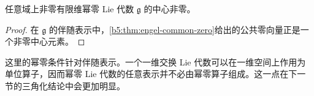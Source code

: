 \begin{corollary}\label{b5:cor:nilpotent-center}
	任意域上非零有限维幂零 Lie 代数 \(\mathfrak g\) 的中心非零。
\end{corollary}
\begin{proof}
	在 \(\mathfrak g\) 的伴随表示中，\cref{b5:thm:engel-common-zero}给出的公共零向量正是一个非零中心元素。
\end{proof}

这里的幂零条件针对伴随表示。一个一维交换 Lie 代数可以在一维空间上作用为单位算子，因而幂零 Lie 代数的任意表示并不必由幂零算子组成。这一点在下一节的三角化结论中会更加明显。
